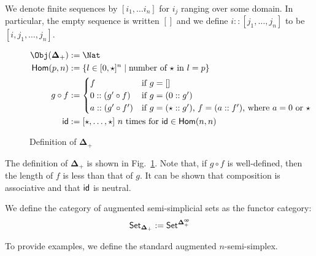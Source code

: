 \documentclass{msc}
\newcommand{\DeltaPlus}{\ensuremath{\boldsymbol{\Delta}_+}}
\newcommand{\kstar}{{\star}}
\begin{document}
\begin{notation}
  We denote finite sequences by $[i_1, \ldots i_n]$ for $i_j$ ranging over some domain. In particular, the empty sequence is written $[]$ and we define $i :: [j_1, \ldots, j_n]$ to be $[i, j_1, \ldots, j_n]$.
\end{notation}

\begin{definition}[$\DeltaPlus$]
  \begin{figure}[H]
    \begin{align*}
      \Obj(\DeltaPlus) & := \Nat                                                                     \\
      \Hom(p, n)       & := \{l \in [0, \kstar]^n \mid \text{number of $\kstar$ in $l = p$}\}        \\
      g \circ f        & :=
      \begin{cases}
        f                  & \text{if $g = []$}                                                        \\
        0 :: (g' \circ f)  & \text{if $g = (0 :: g')$}                                                 \\
        a :: (g' \circ f') & \text{if $g = (\star :: g')$, $f = (a :: f')$, where $a = 0$ or $\kstar$} \\
      \end{cases} \\
      \id              & := [\kstar, \ldots, \kstar] \text{ $n$ times for $\id \in \Hom(n, n)$}
    \end{align*}
    \caption{Definition of \DeltaPlus}\label{fig:deltaplus}
  \end{figure}

  The definition of $\DeltaPlus$ is shown in Fig.~\ref{fig:deltaplus}. Note that, if $g \circ f$ is well-defined, then the length of $f$ is less than that of $g$. It can be shown that composition is associative and that $\mathsf{id}$ is neutral.
\end{definition}

\begin{definition}[$\Set_{\DeltaPlus}$]
  We define the category of augmented semi-simplicial sets as the functor category:
  \begin{equation*}
    \Set_{\DeltaPlus} := \Set^{\DeltaPlus^{\mathsf{op}}}
  \end{equation*}
\end{definition}

To provide examples, we define the standard augmented $n$-semi-simplex.
\end{document}
